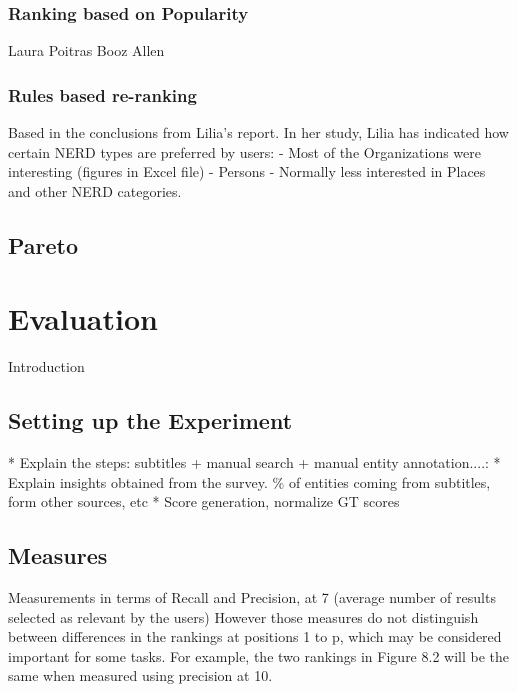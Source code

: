 \documentclass{llncs}
\begin{document}
\subsubsection{Ranking based on Popularity}
Laura Poitras
Booz Allen


\subsubsection{Rules based re-ranking}
Based in the conclusions from Lilia's report. In her study, Lilia has indicated how certain NERD types are preferred by users:
- Most of the Organizations were interesting (figures in Excel file)
- Persons 
- Normally less interested in Places and other NERD categories.


\subsection{Pareto}


\section{Evaluation}
\label{sec:Evaluation}

Introduction

\subsection{Setting up the Experiment}
\label{sec:settingUp}


* Explain the steps: subtitles + manual search + manual  entity annotation....:
* Explain insights obtained from the survey. \% of entities coming from subtitles, form other sources, etc
* Score generation, normalize GT scores

\subsection{Measures}
 
Measurements in terms of Recall and Precision, at 7 (average number of results selected as relevant by the users)
However those measures do not distinguish between differences in the rankings at positions 1 to p, which may be considered important for some tasks. For example, the two rankings in Figure 8.2 will be the same when measured using precision at 10. 
 
\end{document}
